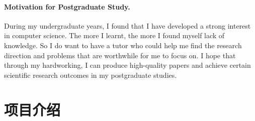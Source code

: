 \documentclass[letterpaper]{article}
\begin{document}
\paragraph{Motivation for Postgraduate Study.}
During my undergraduate years, I found that I have developed a strong interest in computer science. The more I learnt, the more I found myself lack of knowledge. So I do want to have a tutor who could help me find the research direction and problems that are worthwhile for me to focus on. I hope that through my hardworking, I can produce high-quality papers and achieve certain scientific research outcomes in my postgraduate studies.

\section{项目介绍}
\end{document}
